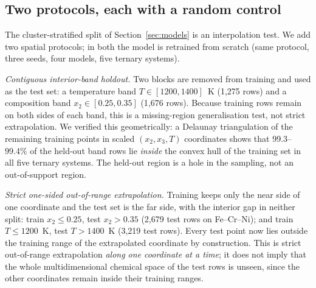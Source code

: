 \documentclass[preprint,12pt,authoryear]{elsarticle}
\begin{document}
\subsection{Two protocols, each with a random control}
\label{sec:protocols}

The cluster-stratified split of Section~\ref{sec:models} is an interpolation
test. We add two spatial protocols; in both the model is retrained from
scratch (same protocol, three seeds, four models, five ternary systems).

\emph{Contiguous interior-band holdout.} Two blocks are removed from
training and used as the test set: a temperature band $T \in [1200,
1400]$~K (1{,}275 rows) and a composition band $x_2 \in [0.25, 0.35]$
(1{,}676 rows). Because training rows remain on both sides of each band,
this is a missing-region generalisation test, not strict extrapolation. We
verified this geometrically: a Delaunay triangulation of the remaining
training points in scaled $(x_2, x_3, T)$ coordinates shows that
99.3--99.4\% of the held-out band rows lie \emph{inside} the convex hull of
the training set in all five ternary systems. The held-out region is a hole in the
sampling, not an out-of-support region.

\emph{Strict one-sided out-of-range extrapolation.} Training keeps only the
near side of one coordinate and the test set is the far side, with the
interior gap in neither split: train $x_2 \le 0.25$, test $x_2 > 0.35$
(2{,}679 test rows on Fe--Cr--Ni); and train $T \le 1200$~K, test $T >
1400$~K (3{,}219 test rows). Every test point now lies outside the training
range of the extrapolated coordinate by construction. This is strict
out-of-range extrapolation \emph{along one coordinate at a time}; it does
not imply that the whole multidimensional chemical space of the test rows
is unseen, since the other coordinates remain inside their training ranges.
\end{document}
